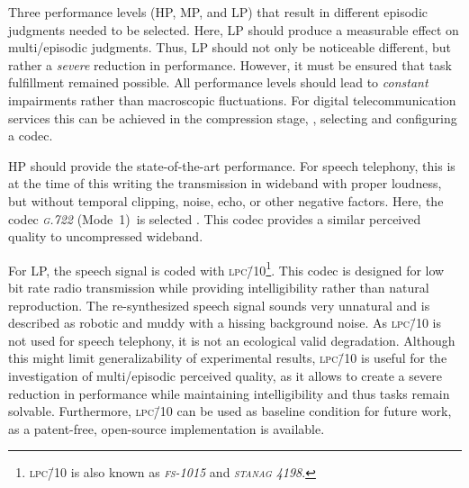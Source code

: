 Three performance levels (\ac{HP}, \ac{MP}, and \ac{LP}) that result in different episodic judgments needed to be selected.
Here, \ac{LP} should produce a measurable effect on multi\-/episodic judgments.
Thus, \ac{LP} should not only be noticeable different, but rather a \emph{severe} reduction in performance.
However, it must be ensured that task fulfillment remained possible.
All performance levels should lead to \emph{constant} impairments rather than macroscopic fluctuations.
For digital telecommunication services this can be achieved in the compression stage, \eg, selecting and configuring a codec.

\ac{HP} should provide the state-of-the-art performance.
For speech telephony, this is at the time of this writing the transmission in wideband with proper loudness, but without temporal clipping, noise, echo, or other negative factors.
Here, the codec \emph{\textsc{\lowercase{G.722}}} (Mode~1)~is selected \citep{itu-t_recommendation_g.722_7_2012}.
This codec provides a similar perceived quality to uncompressed wideband. %

For \ac{LP}, the speech signal is coded with \textsc{\lowercase{LPC\=/10}}\footnote{\textsc{\lowercase{LPC\=/10}} is also known as \emph{\textsc{\lowercase{FS-}}1015} and \emph{\textsc{\lowercase{STANAG}} 4198}.}.
This codec is designed for low bit rate radio transmission while providing intelligibility rather than natural reproduction.
The re-synthesized speech signal sounds very unnatural and is described as robotic and muddy with a hissing background noise. 
As \textsc{\lowercase{LPC\=/10}} is not used for speech telephony, it is not an ecological valid degradation.
Although this might limit generalizability of experimental results, \textsc{\lowercase{LPC\=/10}} is useful for the investigation of multi\-/episodic perceived quality, as it allows to create a severe reduction in performance while maintaining intelligibility and thus tasks remain solvable.
Furthermore, \textsc{\lowercase{LPC\=/10}} can be used as baseline condition for future work, as a patent-free, open-source implementation is available.

